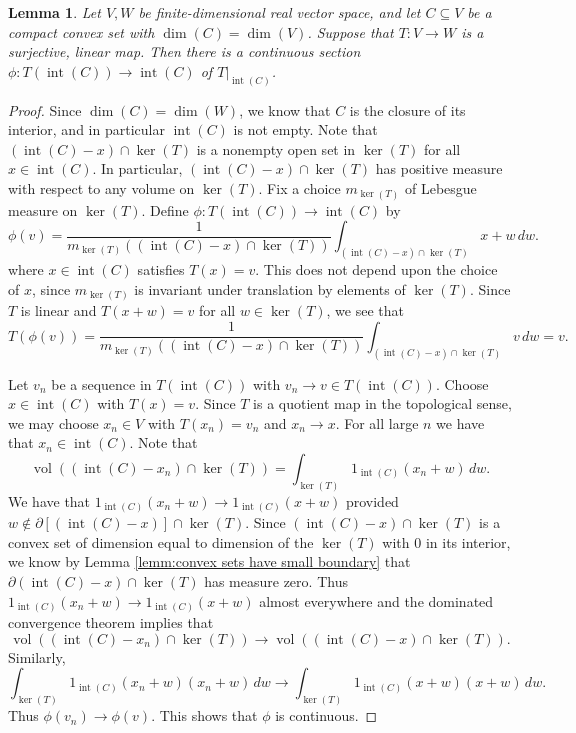 \documentclass[10pt]{amsart}
\newtheorem{lem}[thm]{Lemma}
\theoremstyle{definition}
\numberwithin{equation}{section}
\DeclareMathOperator{\vol}{vol}
\DeclareMathOperator{\Int}{int}
\begin{document}
\begin{lem}\label{lem: continuous sections on convex sets}
Let $V,W$ be finite-dimensional real vector space, and let $C\subseteq V$ be a compact convex set with $\dim(C)=\dim(V)$. Suppose that $T\colon V\to W$ is a surjective, linear map. Then there is a continuous section $\phi\colon T(\Int(C))\to \Int(C)$ of $T\big|_{\Int(C)}$.
\end{lem}

\begin{proof}


Since $\dim(C)=\dim(W)$, we know that $C$ is the closure of its interior, and in particular $\Int(C)$ is not empty.
Note that 
$(\Int(C)-x)\cap \ker(T)$
is a nonempty open set in $\ker(T)$ for all $x\in \Int(C)$. In particular, $(\Int(C)-x)\cap \ker(T)$ has positive measure with respect to any volume on $\ker(T)$.
Fix a choice $m_{\ker(T)}$ of Lebesgue measure on $\ker(T)$. 
Define $\phi\colon T(\Int(C))\to \Int(C)$ by
\[\phi(v)=\frac{1}{m_{\ker(T)}((\Int(C)-x)\cap \ker(T))}\int_{(\Int(C)-x)\cap\ker(T)}x+w\,dw.\]
where $x\in \Int(C)$ satisfies $T(x)=v$. This does not depend upon the choice of $x$, since $m_{\ker(T)}$ is invariant under translation by elements of $\ker(T)$.
Since $T$ is linear and $T(x+w)=v$ for all $w\in \ker(T)$, we see that 
\[T(\phi(v))=\frac{1}{m_{\ker(T)}((\Int(C)-x)\cap \ker(T))}\int_{(\Int(C)-x)\cap \ker(T)}v\,dw=v.\]

Let $v_{n}$ be a sequence in $T(\Int(C))$ with $v_{n}\to v\in T(\Int(C))$. Choose $x\in \Int(C)$ with $T(x)=v$. Since $T$ is a quotient map in the topological sense, we may choose $x_{n}\in V$ with $T(x_{n})=v_{n}$ and $x_{n}\to x$. For all large $n$ we have that $x_{n}\in \Int(C)$. Note that
\[\vol((\Int(C)-x_{n})\cap \ker(T))=\int_{\ker(T)}1_{\Int(C)}(x_{n}+w)\,dw.\]
We have that $1_{\Int(C)}(x_{n}+w)\to 1_{\Int(C)}(x+w)$ provided $w\notin \partial [(\Int(C)-x)]\cap \ker(T)$. 
Since $(\Int(C)-x)\cap \ker(T)$ is a convex set of dimension equal to dimension of the $\ker(T)$ with $0$ in its interior, we know by Lemma \ref{lemm:convex sets have small boundary} that $\partial(\Int(C)-x)\cap \ker(T)$ has measure zero. 
Thus $1_{\Int(C)}(x_{n}+w)\to 1_{\Int(C)}(x+w)$ almost everywhere and the dominated convergence theorem implies that \[\vol((\Int(C)-x_{n})\cap \ker(T))\to \vol((\Int(C)-x)\cap \ker(T)).\]
Similarly,
\[\int_{\ker(T)}1_{\Int(C)}(x_{n}+w)(x_{n}+w)\,dw\to \int_{\ker(T)}1_{\Int(C)}(x+w)(x+w)\,dw.\]
Thus $\phi(v_{n})\to \phi(v)$. This shows that $\phi$ is continuous.


\end{proof}
\end{document}
